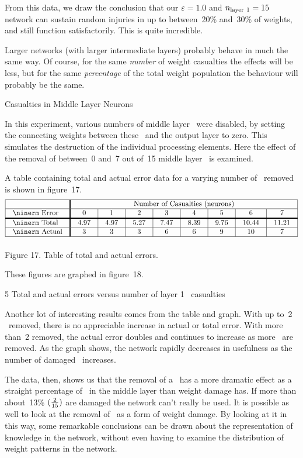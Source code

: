 From this data, we draw the conclusion that our $\varepsilon = 1.0$
and $n_{\rm layer\ 1} = 15$ network can sustain random injuries in up to
between~20\% and~30\% of weights, and still function satisfactorily.
This is quite incredible.

Larger networks (with larger intermediate layers) probably behave in
much the same way.
Of course, for the same {\sl number\/} of weight casualties the
effects will be less, but for the same {\sl percentage\/} of the
total weight population the behaviour will probably be the same.

\sec Casualties in Middle Layer Neurons

In this experiment, various numbers of middle layer \neus\ were
disabled, by setting the connecting weights between these \neus\ and
the output layer to zero.
This simulates the destruction of the individual processing
elements.
Here the effect of the removal of between~0 and~7 out of~15 middle
layer \neus\ is examined.

A table containing total and actual error data for a varying number
of \neus\ removed is shown in figure~17.
$$
\vbox{\tabskip=0pt \offinterlineskip
\def\tablerule{\noalign{\hrule}}
\halign{\strut#& \vrule#\tabskip=1em plus2em&
 #\hfil& \vrule width1.5pt#&
 \hfil#\hfil& \vrule#&
 \hfil#\hfil& \vrule#&
 \hfil#\hfil& \vrule#&
 \hfil#\hfil& \vrule#&
 \hfil#\hfil& \vrule#&
 \hfil#\hfil& \vrule#&
 \hfil#\hfil& \vrule#&
 \hfil#\hfil& \vrule#\tabskip=0pt\cr
\tablerule
&&&&\multispan{15}\hfil Number of Casualties (\neus)\hfil&\cr
\tablerule
&&{\ninerm Error}&&0&&1&&2&&3&&4&&5&&6&&7&\cr
\noalign{\hrule height1.5pt}
&&{\ninerm Total}&&4.97&&4.97&&5.27&&7.47&&8.39&&9.76&&10.44&&11.21&\cr
\tablerule
&&{\ninerm Actual}&&3&&3&&3&&6&&6&&9&&10&&7&\cr
\tablerule
}}
$$
\centerline{Figure 17. Table of total and actual errors.}

These figures are graphed in figure~18.

 {5} {Total and actual errors versus number of layer 1
\neu\ casualties}

Another lot of interesting results comes from the table and graph.
With up to~2 \neus\ removed, there is no appreciable increase in
actual or total error.
With more than~2 removed, the actual error doubles and continues to
increase as more \neus\ are removed.
As the graph shows, the network rapidly decreases in usefulness as
the number of damaged \neus\ increases.

The data, then, shows us that the removal of a \neu\ has a more
dramatic effect as a straight percentage of \neus\ in the middle
layer than weight damage has.
If more than about~13\% $({2\over15})$ are damaged the network can't
really be used.
It is possible as well to look at the removal of \neus\ as a form of
weight damage.
By looking at it in this way, some remarkable conclusions can be
drawn about the representation of knowledge in the network, 
without even having to examine the distribution of weight
patterns in the network.

